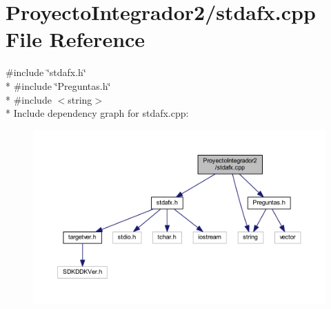 \section{Proyecto\-Integrador2/stdafx.cpp File Reference}
\label{stdafx_8cpp}
{\ttfamily \#include \char`\"{}stdafx.\-h\char`\"{}}\\*
{\ttfamily \#include \char`\"{}Preguntas.\-h\char`\"{}}\\*
{\ttfamily \#include $<$string$>$}\\*
Include dependency graph for stdafx.\-cpp\-:\nopagebreak
\begin{figure}[H]
\begin{center}
\leavevmode
\includegraphics[width=350pt]{stdafx_8cpp__incl}
\end{center}
\end{figure}

